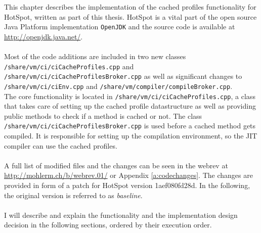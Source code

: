 This chapter describes the implementation of the cached profiles functionality for HotSpot, written as part of this thesis.
HotSpot is a vital part of the open source Java Platform implementation \texttt{OpenJDK} and the source code is available at \url{http://openjdk.java.net/}.
\\\\
Most of the code additions are included in two new classes \texttt{/share/vm/ci/ciCacheProfiles.cpp} and \texttt{/share/vm/ci/ciCacheProfilesBroker.cpp} as well as significant changes to \\\texttt{/share/vm/ci/ciEnv.cpp} and \texttt{/share/vm/compiler/compileBroker.cpp}.
\\
The core functionality is located in \texttt{/share/vm/ci/ciCacheProfiles.cpp}, a class that takes care of setting up the cached profile datastructure as well as providing public methods to check if a method is cached or not. The class \texttt{/share/vm/ci/ciCacheProfilesBroker.cpp} is used before a cached method gets compiled. It is responsible for setting up the compilation environment, so the JIT compiler can use the cached profiles.
\\\\
A full list of modified files and the changes can be seen in the webrev at \url{http://mohlerm.ch/b/webrev.01/} or Appendix \ref{a:codechanges}.
The changes are provided in form of a patch for HotSpot version 1aef080fd28d. In the following, the original version is referred to as \textit{baseline}.
\\\\
I will describe and explain the functionality and the implementation design decision in the following sections, ordered by their execution order.

